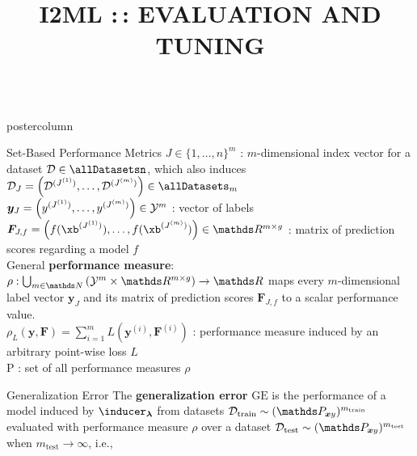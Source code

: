 \documentclass{beamer}
\title{I2ML :\,: EVALUATION AND TUNING} %
\newlength{\columnheight} %
\begin{document}
\begin{frame}[fragile]{}
\vspace{-8ex}
\begin{columns}
	\begin{column}{.31\textwidth}
		\begin{beamercolorbox}[center]{postercolumn}
			\begin{minipage}{.98\textwidth}
				\parbox[t][\columnheight]{\textwidth}{
\begin{myblock}{Set-Based Performance Metrics}
$J \in \{1,\dots,n\}^m$ : $m$-dimensional index vector for a dataset $\D \in 
\allDatasetsn$, which also induces 
$\D_J = \left(\D^{(J^{(1)})},\dots,\D^{(J^{(m)})}\right) \in \allDatasets_m$\\


$\boldsymbol{y}_J = \left(y^{(J^{(1)})},\dots,y^{(J^{(m)})}\right) \in \mathcal{Y}^m$ :
vector of labels\\

$\boldsymbol{F}_{J,f} = \left(f(\xb^{(J^{(1)})}),\dots, f(\xb^{(J^{(m)})})\right) 
\in \R^{m\times g}$ : matrix of prediction scores regarding a model $f$\\

General \textbf{performance measure}: $\rho: \bigcup_{m\in\N}\left(\Yspace^m\times\R^{m\times g}\right)  \rightarrow \R$ maps every $m$-dimensional label vector $\boldsymbol{y}_J$ and its matrix of prediction scores $\boldsymbol{F}_{J,f}$ to a scalar performance value.\\

$\rho_L (\boldsymbol{y}, \boldsymbol{F}) = \sum_{i=1}^m L(\boldsymbol{y}^{(i)}, \boldsymbol{F}^{(i)})$ : performance measure induced by an arbitrary point-wise loss $L$\\

$\mathrm{P}$ : set of all performance measures $\rho$ 
\end{myblock}
\begin{myblock}{Generalization Error}
The \textbf{generalization error} $\mathrm{GE}$ is the performance of a model induced by $\inducer_{\boldsymbol{\lambda}}$ from datasets $\Dtrain \sim (\P_{\xv y})^{m_{\mathrm{train}}}$ evaluated with performance measure $\rho$ over a dataset $\Dtest \sim (\P_{\xv y})^{m_{\mathrm{test}}}$ when $m_{\mathrm{test}}\rightarrow\infty$, i.e.,\\


\end{myblock}}
\end{minipage}
\end{beamercolorbox}
\end{column}
\end{columns}
\end{frame}
\end{document}
